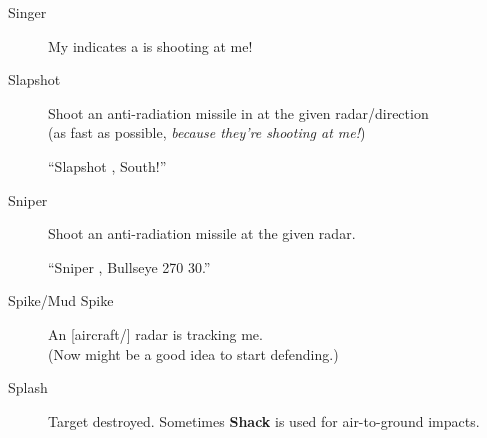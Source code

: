 \begin{description}
\item[Singer] My  indicates a  is shooting at me!

\item[Slapshot] Shoot an anti-radiation missile in at the given radar/direction \\
    (as fast as possible, \emph{because they're shooting at me!})

    ``Slapshot , South!''

\item[Sniper] Shoot an anti-radiation missile at the given  radar.

    ``Sniper , Bullseye 270 30.''

\item[Spike/Mud Spike] An [aircraft/] radar is tracking me. \\
    (Now might be a good idea to start defending.)

\item[Splash] Target destroyed. Sometimes \textbf{Shack} is used for
    air-to-ground impacts.

\end{description}
